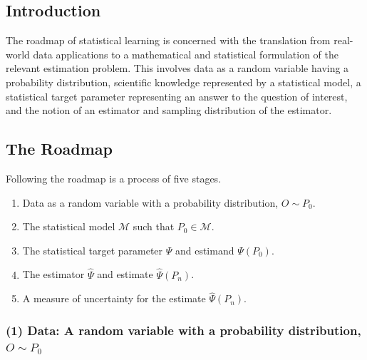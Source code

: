 \documentclass[12pt, krantz2,]{krantz}
\providecommand{\tightlist}{%
  \setlength{\itemsep}{0pt}\setlength{\parskip}{0pt}}
\theoremstyle{definition}
\theoremstyle{definition}
\theoremstyle{definition}
\newcommand{\M}{\mathcal{M}}
\newcommand{\1}{\mathbbm{1}}
\begin{document}
\hypertarget{introduction}{%
\subsection*{Introduction}\label{introduction}}


The roadmap of statistical learning is concerned with the translation from
real-world data applications to a mathematical and statistical formulation of
the relevant estimation problem. This involves data as a random variable having
a probability distribution, scientific knowledge represented by a statistical
model, a statistical target parameter representing an answer to the question of
interest, and the notion of an estimator and sampling distribution of the
estimator.

\hypertarget{roadmap}{%
\subsection{The Roadmap}\label{roadmap}}

Following the roadmap is a process of five stages.

\begin{enumerate}
\def\labelenumi{\arabic{enumi}.}
\tightlist
\item
  Data as a random variable with a probability distribution, \(O \sim P_0\).
\item
  The statistical model \(\M\) such that \(P_0 \in \M\).
\item
  The statistical target parameter \(\Psi\) and estimand \(\Psi(P_0)\).
\item
  The estimator \(\hat{\Psi}\) and estimate \(\hat{\Psi}(P_n)\).
\item
  A measure of uncertainty for the estimate \(\hat{\Psi}(P_n)\).
\end{enumerate}

\hypertarget{data-a-random-variable-with-a-probability-distribution-o-sim-p_0}{%
\subsubsection*{\texorpdfstring{(1) Data: A random variable with a probability distribution, \(O \sim P_0\)}{(1) Data: A random variable with a probability distribution, O \textbackslash{}sim P\_0}}\label{data-a-random-variable-with-a-probability-distribution-o-sim-p_0}}
\end{document}
